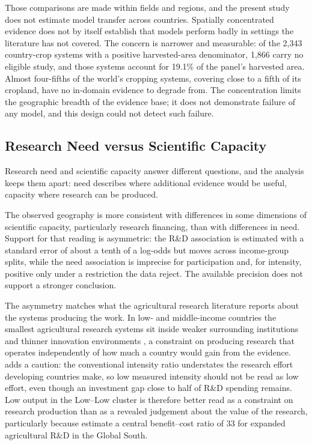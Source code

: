 \documentclass[ASNA,twocolumn]{USG}
\begin{document}
Those comparisons are made within fields and regions, and the present study does not estimate
model transfer across countries. Spatially concentrated evidence does not by itself establish
that models perform badly in settings the literature has not covered. The concern is narrower
and measurable: of the 2,343 country-crop systems with a positive harvested-area denominator, 1,866 carry no
eligible study, and those systems account for 19.1\% of the panel's harvested area. Almost four-fifths of the world's cropping systems, covering close to a fifth of its
cropland, have no in-domain evidence to degrade from. The concentration limits the geographic breadth of the evidence base; it does
not demonstrate failure of any model, and this design could not detect such failure.

\subsection{Research Need versus Scientific Capacity}

Research need and scientific capacity answer different questions, and the analysis keeps them
apart: need describes where additional evidence would be useful, capacity where research
can be produced. 

The observed geography is more consistent with differences in some dimensions of scientific
capacity, particularly research financing, than with differences in need. Support for that reading is asymmetric: the R\&D association is estimated with a standard error
of about a tenth of a log-odds but moves across income-group splits, while the need association
is imprecise for participation and, for intensity, positive only under a restriction the data
reject. The available precision does not support a stronger conclusion.

The asymmetry matches what the agricultural research literature reports about the systems
producing the work. In low- and middle-income countries the smallest agricultural research systems sit inside
weaker surrounding institutions and thinner innovation environments \cite{NinPratt2023},
a constraint on producing research that operates independently of how much a country would
gain from the evidence.
\citet{NinPratt2021} adds a caution: the conventional intensity ratio understates the
research effort developing countries make, so low measured intensity should not be read as low
effort, even though an investment gap close to half of R\&D spending remains. Low output in the Low--Low cluster is therefore better read as a
constraint on research production than as a revealed judgement about the value of the
research, particularly because \citet{Rosegrant2023} estimate a central benefit--cost
ratio of 33 for expanded agricultural R\&D in the Global South.
\end{document}
